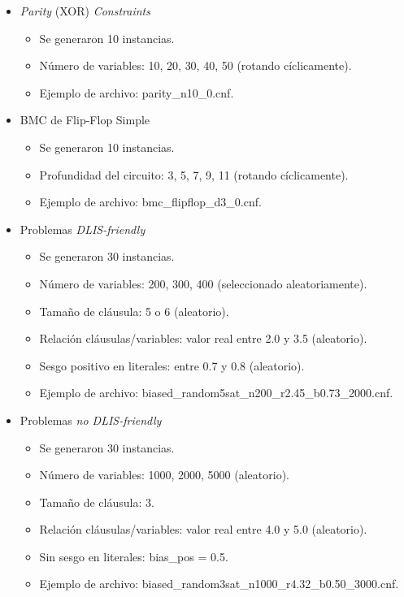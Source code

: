 \begin{itemize}
\begin{itemize}
    \end{itemize}
    \item \textit{Parity} (XOR) \textit{Constraints}
    \begin{itemize}
        \item Se generaron 10 instancias.
        \item Número de variables: 10, 20, 30, 40, 50 (rotando cíclicamente).
        \item Ejemplo de archivo: parity\_n10\_0.cnf.
    \end{itemize}
    \item BMC de Flip-Flop Simple
    \begin{itemize}
        \item Se generaron 10 instancias.
        \item Profundidad del circuito: 3, 5, 7, 9, 11 (rotando cíclicamente).
        \item Ejemplo de archivo: bmc\_flipflop\_d3\_0.cnf.
    \end{itemize}
    \item Problemas \textit{DLIS-friendly}
    \begin{itemize}
        \item Se generaron 30 instancias.
        \item Número de variables: 200, 300, 400 (seleccionado aleatoriamente).
        \item Tamaño de cláusula: 5 o 6 (aleatorio).
        \item Relación cláusulas/variables: valor real entre 2.0 y 3.5 (aleatorio).
        \item Sesgo positivo en literales: entre 0.7 y 0.8 (aleatorio).
        \item Ejemplo de archivo: biased\_random5sat\_n200\_r2.45\_b0.73\_2000.cnf.
    \end{itemize}
    \item Problemas \textit{no DLIS-friendly}
    \begin{itemize}
        \item Se generaron 30 instancias.
        \item Número de variables: 1000, 2000, 5000 (aleatorio).
        \item Tamaño de cláusula: 3.
        \item Relación cláusulas/variables: valor real entre 4.0 y 5.0 (aleatorio).
        \item Sin sesgo en literales: bias\_pos = 0.5.
        \item Ejemplo de archivo: biased\_random3sat\_n1000\_r4.32\_b0.50\_3000.cnf.
    \end{itemize}
\end{itemize}

